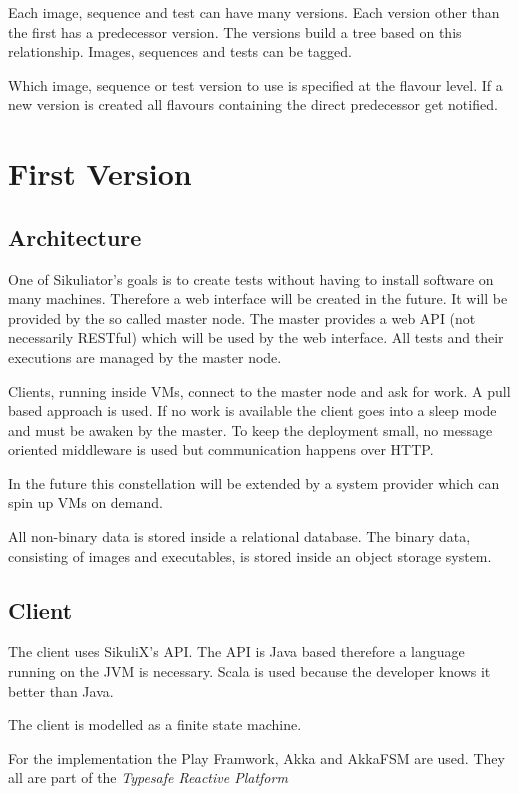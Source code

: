 \documentclass[a4paper,twocolumn]{article}
\begin{document}
Each image, sequence and test can have many versions.
Each version other than the first has a predecessor version.
The versions build a tree based on this relationship.
Images, sequences and tests can be tagged.

Which image, sequence or test version to use is specified at the flavour level.
If a new version is created all flavours containing the direct predecessor get notified.

\section{First Version}
\subsection{Architecture}
One of Sikuliator's goals is to create tests without having to install software on many machines.
Therefore a web interface will be created in the future.
It will be provided by the so called master node.
The master provides a web API (not necessarily RESTful) which will be used by the web interface.
All tests and their executions are managed by the master node.

Clients, running inside VMs, connect to the master node and ask for work.
A pull based approach is used.
If no work is available the client goes into a sleep mode and must be awaken by the master.
To keep the deployment small, no message oriented middleware is used but communication happens over HTTP.

In the future this constellation will be extended by a system provider which can spin up VMs on demand.

All non-binary data is stored inside a relational database.
The binary data, consisting of images and executables, is stored inside an object storage system.


\subsection{Client}
The client uses SikuliX's API.
The API is Java based therefore a language running on the JVM is necessary.
Scala is used because the developer knows it better than Java.

The client is modelled as a finite state machine.

For the implementation the Play Framwork\cite{Play}, Akka\cite{Akka} and AkkaFSM\cite{AkkaFSM} are used.
They all are part of the \emph{Typesafe Reactive Platform}\cite{TypesafeRP}
\end{document}
